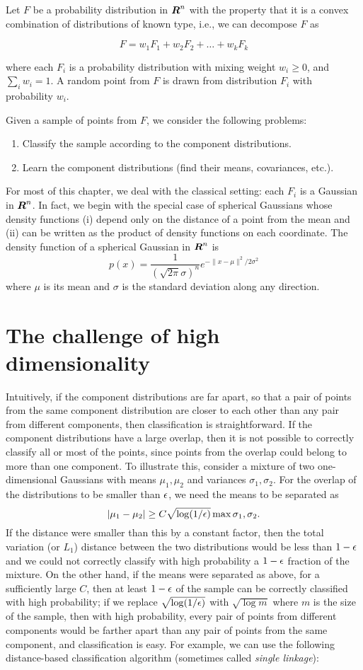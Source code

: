 \documentclass{book}
\numberwithin{exercise}{chapter}
\begin{document}
Let $F$ be a probability distribution in $\mbox{\mbox{\boldmath $R$}}^n$ with the property that
 it is a convex combination of
 distributions of known type, i.e., we can decompose $F$ as

$$F = w_1F_1 + w_2F_2 + \dots + w_kF_k$$

where each $F_i$ is a probability distribution with mixing weight $w_i
\ge 0$, and $\sum_i{w_i} = 1$.  A random point from $F$ is drawn
from distribution $F_i$ with probability $w_i$.

Given a sample of points from $F$, we consider the following problems:
\begin{enumerate}
\item Classify the sample according to the component distributions.
\item Learn the component distributions
(find their means, covariances, etc.).
\end{enumerate}

For most of this chapter, we deal with the classical setting:
each $F_i$ is a Gaussian in $\mbox{\mbox{\boldmath $R$}}^n$.  In fact, we begin with the special case of
spherical Gaussians whose density functions (i) depend only on
the distance of a point from the mean and (ii)
can be written as the product of density functions on
each coordinate. The density function of a spherical Gaussian in $\mbox{\mbox{\boldmath $R$}}^n$ is
\[
p(x) = \frac{1}{(\sqrt{2\pi}\sigma)^n}e^{-\|x-\mu\|^2/2\sigma^2}
\]
where $\mu$ is its mean and $\sigma$ is the standard deviation along any direction.

\section{The challenge of high dimensionality}

Intuitively, if the component distributions are far apart, so that a pair of points from the same component distribution
are closer to each other than any pair from different components, then classification
is straightforward. If the component distributions have a large overlap, then it is not possible to correctly classify all
or most of the points, since points from the overlap could belong to more than one component.
To illustrate this, consider a mixture of two one-dimensional Gaussians with means $\mu_1,\mu_2$
and variances $\sigma_1, \sigma_2$. For the overlap of the distributions to be smaller than $\epsilon$, we need the means to
be separated as
\[
|\mu_1-\mu_2| \ge C\sqrt{\log (1/\epsilon)}\max{\sigma_1,\sigma_2}.
\]
If the distance were smaller than this by a constant factor, then the total variation (or $L_1$) distance between the two
distributions would be less than $1-\epsilon$ and we could not correctly classify with high probability a $1-\epsilon$ fraction of
the mixture. On the other hand, if the means were separated as above, for a sufficiently large $C$, then at least
$1-\epsilon$ of the sample can be correctly classified with high probability; if we replace $\sqrt{\log (1/\epsilon)}$ with
$\sqrt{\log m}$ where $m$ is the size of the sample, then with high probability, every pair of points from different components
would be farther apart than any pair of points from the same component, and classification is easy.  For example, we can
use the following distance-based classification algorithm (sometimes called {\em single linkage}):
\end{document}
